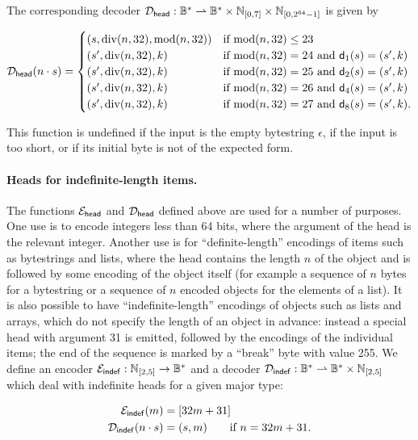 \noindent The corresponding decoder $\mathcal{D}_{\mathsf{head}}: \mathbb{B}^* \rightharpoonup \mathbb{B}^* \times
\mathbb{N}_{[0,7]} \times \mathbb{N}_{[0,2^{64}-1]}$ is given by

$$
  \mathcal{D}_{\mathsf{head}}(n \cdot s) =
  \begin{cases}
    (s, \operatorname{div}(n,32), \operatorname{mod}(n,32)) & \text{if $\operatorname{mod}(n,32) \leq 23$}\\
    (s', \operatorname{div}(n,32), k) & \text{if $\operatorname{mod}(n,32) = 24$ and $\mathsf{d}_1(s) = (s', k)$}\\
    (s', \operatorname{div}(n,32), k) & \text{if $\operatorname{mod}(n,32) = 25$ and $\mathsf{d}_2(s) = (s', k)$}\\
    (s', \operatorname{div}(n,32), k) & \text{if $\operatorname{mod}(n,32) = 26$ and $\mathsf{d}_4(s) = (s', k)$}\\
    (s', \operatorname{div}(n,32), k) & \text{if $\operatorname{mod}(n,32) = 27$ and $\mathsf{d}_8(s) = (s', k)$}.
  \end{cases}
$$

\noindent This function is undefined if the input is the empty bytestring
$\epsilon$, if the input is too short, or if its initial byte is not of the
expected form.

\paragraph{Heads for indefinite-length items.}
The functions $\mathcal{E}_{\mathsf{head}}$ and $\mathcal{D}_{\mathsf{head}}$ defined above are used for a number of
purposes.  One use is to encode integers less than 64 bits, where the argument
of the head is the relevant integer.  Another use is for ``definite-length''
encodings of items such as bytestrings and lists, where the head contains the
length $n$ of the object and is followed by some encoding of the object itself
(for example a sequence of $n$ bytes for a bytestring or a sequence of $n$
encoded objects for the elements of a list).  It is also possible to have
``indefinite-length'' encodings of objects such as lists and arrays, which do
not specify the length of an object in advance: instead a special head with
argument 31 is emitted, followed by the encodings of the individual items; the
end of the sequence is marked by a ``break'' byte with value 255.  We define an
encoder $\mathcal{E}_{\mathsf{indef}}: \mathbb{N}_{[2,5]} \rightarrow \mathbb{B}^*$ and a decoder
$\mathcal{D}_{\mathsf{indef}}: \mathbb{B}^* \rightharpoonup \mathbb{B}^* \times \mathbb{N}_{[2,5]}$ which deal
with indefinite heads for a given major type:

\begin{align*}
  \mathcal{E}_{\mathsf{indef}}(m) &= [32m+31]\\
  \mathcal{D}_{\mathsf{indef}}(n \cdot s) & = (s, m) \qquad \text{if $n = 32m+31$}.
\end{align*}

